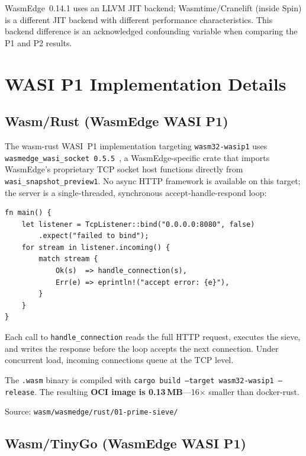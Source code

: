 \acs{WasmEdge}~0.14.1 uses an \acs{LLVM} \acs{JIT} backend; Wasmtime/Cranelift (inside Spin) is a different \acs{JIT} backend with different performance characteristics. This backend difference is an acknowledged confounding variable when comparing the P1 and P2 results.

\section{WASI P1 Implementation Details}
\label{app:wasmedge_impl}

\subsection{Wasm/Rust (WasmEdge WASI P1)}

The wasm-rust \acs{WASI}~P1 implementation targeting \texttt{wasm32-wasip1} uses \texttt{wasmedge\_wasi\_socket~0.5.5}~\cite{wasmedgewasisocket}, a \acs{WasmEdge}-specific crate that imports \acs{WasmEdge}'s proprietary \acs{TCP} socket host functions directly from \texttt{wasi\_snapshot\_preview1}. No async \acs{HTTP} framework is available on this target; the server is a single-threaded, synchronous accept-handle-respond loop:

\begin{verbatim}
fn main() {
    let listener = TcpListener::bind("0.0.0.0:8080", false)
        .expect("failed to bind");
    for stream in listener.incoming() {
        match stream {
            Ok(s)  => handle_connection(s),
            Err(e) => eprintln!("accept error: {e}"),
        }
    }
}
\end{verbatim}

Each call to \texttt{handle\_connection} reads the full \acs{HTTP} request, executes the sieve, and writes the response before the loop accepts the next connection. Under concurrent load, incoming connections queue at the \acs{TCP} level.

The \texttt{.wasm} binary is compiled with \texttt{cargo build --target wasm32-wasip1 --release}. The resulting \textbf{OCI image is 0.13\,MB}---16$\times$ smaller than docker-rust.

Source: \texttt{wasm/wasmedge/rust/01-prime-sieve/}

\subsection{Wasm/TinyGo (WasmEdge WASI P1)}

